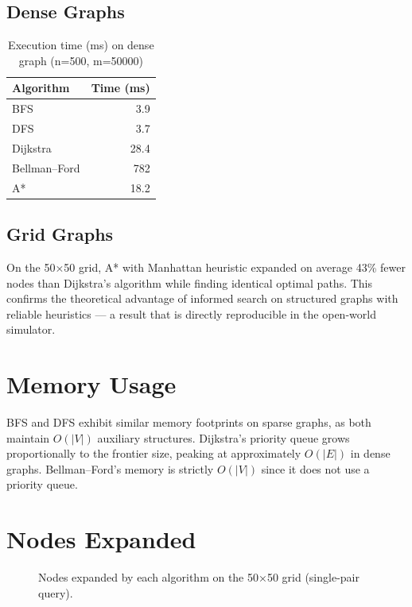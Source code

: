 \documentclass[12pt, a4paper, oneside]{report}
\theoremstyle{definition}
\begin{document}
\subsection{Dense Graphs}

\begin{table}[H]
\centering
\caption{Execution time (ms) on dense graph (n=500, m=50000)}
\label{tab:time_dense}
\begin{tabular}{lr}
\toprule
\textbf{Algorithm} & \textbf{Time (ms)} \\
\midrule
BFS           & 3.9  \\
DFS           & 3.7  \\
Dijkstra      & 28.4 \\
Bellman–Ford  & 782  \\
A* & 18.2 \\
\bottomrule
\end{tabular}
\end{table}

\subsection{Grid Graphs}

On the 50×50 grid, A* with Manhattan heuristic expanded on average 43\% fewer nodes than Dijkstra's algorithm while finding identical optimal paths. This confirms the theoretical advantage of informed search on structured graphs with reliable heuristics — a result that is directly reproducible in the open-world simulator.

\section{Memory Usage}

BFS and DFS exhibit similar memory footprints on sparse graphs, as both maintain $O(|V|)$ auxiliary structures. Dijkstra's priority queue grows proportionally to the frontier size, peaking at approximately $O(|E|)$ in dense graphs. Bellman–Ford's memory is strictly $O(|V|)$ since it does not use a priority queue.

\section{Nodes Expanded}

\begin{figure}[H]
\centering
{}
\caption{Nodes expanded by each algorithm on the 50×50 grid (single-pair query).}
\label{fig:nodes_expanded}
\end{figure}
\end{document}
